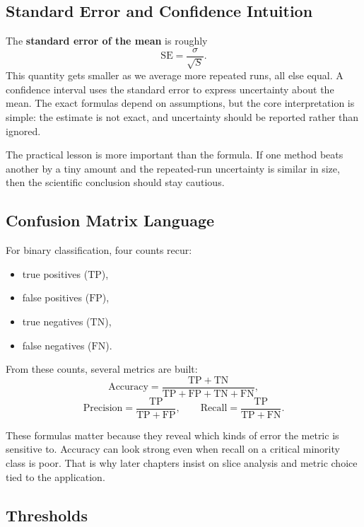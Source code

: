 \subsection{Standard Error and Confidence Intuition}

The \textbf{standard error of the mean} is roughly
\[
\mathrm{SE} = \frac{\sigma}{\sqrt{S}}.
\]
This quantity gets smaller as we average more repeated runs, all else equal. A confidence interval uses the standard error to express uncertainty about the mean. The exact formulas depend on assumptions, but the core interpretation is simple: the estimate is not exact, and uncertainty should be reported rather than ignored.

\begin{mathlens}
The practical lesson is more important than the formula. If one method beats another by a tiny amount and the repeated-run uncertainty is similar in size, then the scientific conclusion should stay cautious.
\end{mathlens}

\subsection{Confusion Matrix Language}

For binary classification, four counts recur:
\begin{itemize}[leftmargin=*]
\item true positives (\(\mathrm{TP}\)),
\item false positives (\(\mathrm{FP}\)),
\item true negatives (\(\mathrm{TN}\)),
\item false negatives (\(\mathrm{FN}\)).
\end{itemize}

From these counts, several metrics are built:
\[
\mathrm{Accuracy} = \frac{\mathrm{TP}+\mathrm{TN}}{\mathrm{TP}+\mathrm{FP}+\mathrm{TN}+\mathrm{FN}},
\]
\[
\mathrm{Precision} = \frac{\mathrm{TP}}{\mathrm{TP}+\mathrm{FP}},
\qquad
\mathrm{Recall} = \frac{\mathrm{TP}}{\mathrm{TP}+\mathrm{FN}}.
\]

These formulas matter because they reveal which kinds of error the metric is sensitive to. Accuracy can look strong even when recall on a critical minority class is poor. That is why later chapters insist on slice analysis and metric choice tied to the application.

\subsection{Thresholds}

